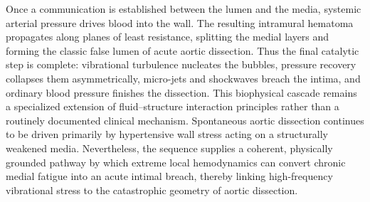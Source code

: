 Once a communication is established between the lumen and the media, systemic arterial pressure drives blood into the wall. The resulting intramural hematoma propagates along planes of least resistance, splitting the medial layers and forming the classic false lumen of acute aortic dissection. Thus the final catalytic step is complete: vibrational turbulence nucleates the bubbles, pressure recovery collapses them asymmetrically, micro-jets and shockwaves breach the intima, and ordinary blood pressure finishes the dissection.
This biophysical cascade remains a specialized extension of fluid–structure interaction principles rather than a routinely documented clinical mechanism. Spontaneous aortic dissection continues to be driven primarily by hypertensive wall stress acting on a structurally weakened media. Nevertheless, the sequence supplies a coherent, physically grounded pathway by which extreme local hemodynamics can convert chronic medial fatigue into an acute intimal breach, thereby linking high-frequency vibrational stress to the catastrophic geometry of aortic dissection.

